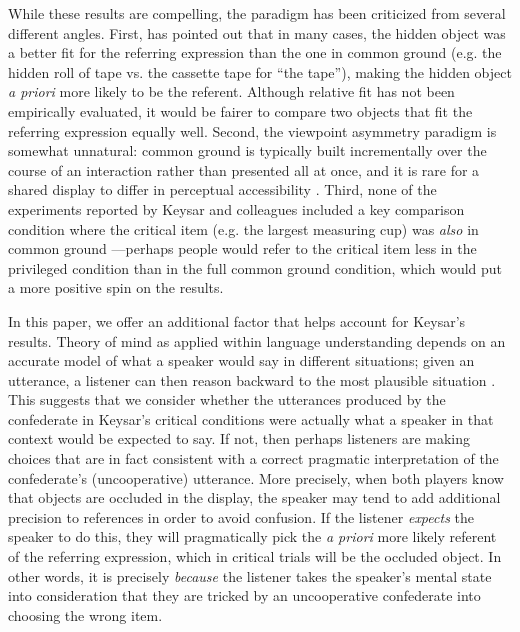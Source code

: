 \documentclass[10pt,letterpaper]{article}
\begin{document}
While these results are compelling, the paradigm has been criticized from several different angles. First,  has pointed out that in many cases, the hidden object was a better fit for the referring expression than the one in common ground (e.g. the hidden roll of tape vs. the cassette tape for ``the tape''), making the hidden object \emph{a priori} more likely to be the referent. Although relative fit has not been empirically evaluated, it would be fairer to compare two objects that fit the referring expression equally well. Second, the viewpoint asymmetry paradigm is somewhat unnatural: common ground is typically built incrementally over the course of an interaction rather than presented all at once, and it is rare for a shared display to differ in perceptual accessibility \cite{HannaTanenhausTrueswell03_CommonGroundPerspective}. Third, none of the experiments reported by Keysar and colleagues included a key comparison condition where the critical item (e.g. the largest measuring cup) was \emph{also} in common ground \cite{BrownSchmidtHanna11_IncrementalPerspectiveTaking}---perhaps people would refer to the critical item less in the privileged condition than in the full common ground condition, which would put a more positive spin on the results. %

In this paper, we offer an additional factor that helps account for Keysar's results. 
Theory of mind as applied within language understanding depends on an accurate model of what a speaker would say in different situations; given an utterance, a listener can then reason backward to the most plausible situation \cite{FrankGoodman12_PragmaticReasoningLanguageGames, GoodmanStuhlmuller13_KnowledgeImplicature}.
This suggests that we consider whether the utterances produced by the confederate in Keysar's critical conditions were actually what a speaker in that context would be expected to say. 
If not, then perhaps listeners are making choices that are in fact consistent with a correct pragmatic interpretation of the confederate's (uncooperative) utterance.
More precisely, when both players know that objects are occluded in the display, the speaker may tend to add additional precision to references in order to avoid confusion. If the listener \emph{expects} the speaker to do this, they will pragmatically pick the \emph{a priori} more likely referent of the referring expression, which in critical trials will be the occluded object. In other words, it is precisely \emph{because} the listener takes the speaker's mental state into consideration that they are tricked by an uncooperative confederate into choosing the wrong item. 
\end{document}
